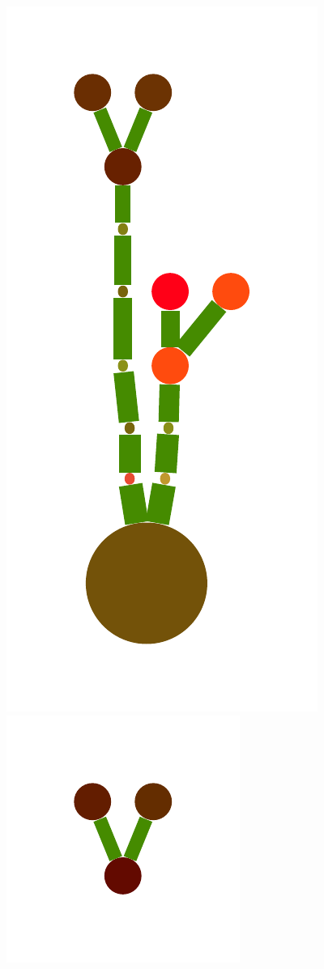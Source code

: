 \documentclass[a4paper,10pt]{article}
\begin{document}
\begin{figure}
{    \includegraphics[scale=.16]{../figures/vector/6-5-tree-induced-17.pdf}
    \includegraphics[scale=.16]{../figures/vector/6-5-tree-induced-18.pdf}
}
\end{figure}
\end{document}
